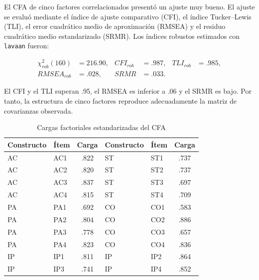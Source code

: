 \documentclass[12pt,letterpaper]{article}
\begin{document}
El CFA de cinco factores correlacionados presentó un ajuste muy bueno. El ajuste se evaluó mediante el índice de ajuste comparativo (CFI), el índice Tucker--Lewis (TLI), el error cuadrático medio de aproximación (RMSEA) y el residuo cuadrático medio estandarizado (SRMR). Los índices robustos estimados con \texttt{lavaan} fueron:

\[
\begin{aligned}
\chi^2_{rob}(160)&=216.90, & CFI_{rob}&=.987, & TLI_{rob}&=.985,\\
RMSEA_{rob}&=.028, & SRMR&=.033.
\end{aligned}
\]

El CFI y el TLI superan .95, el RMSEA es inferior a .06 y el SRMR es bajo. Por tanto, la estructura de cinco factores reproduce adecuadamente la matriz de covarianzas observada.


\begin{table}[H]
\centering
\caption{Ajuste global del CFA de cinco factores}
\label{tab:p3-ajuste-cfa}
\end{table}

\begin{table}[H]
\centering
\caption{Cargas factoriales estandarizadas del CFA}
\begin{tabular}{llc@{\qquad}llc}
\toprule
Constructo & Ítem & Carga & Constructo & Ítem & Carga \\
\midrule
AC & AC1 & .822 & ST & ST1 & .737 \\
AC & AC2 & .820 & ST & ST2 & .737 \\
AC & AC3 & .837 & ST & ST3 & .697 \\
AC & AC4 & .815 & ST & ST4 & .709 \\
PA & PA1 & .692 & CO & CO1 & .583 \\
PA & PA2 & .804 & CO & CO2 & .886 \\
PA & PA3 & .778 & CO & CO3 & .657 \\
PA & PA4 & .823 & CO & CO4 & .836 \\
IP & IP1 & .811 & IP & IP2 & .864 \\
IP & IP3 & .741 & IP & IP4 & .852 \\
\bottomrule
\end{tabular}
\end{table}
\end{document}
